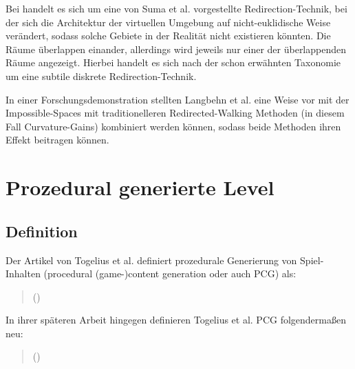 Bei  handelt es sich um eine von
Suma et al. \cite{impossible-spaces-suma} vorgestellte Redirection-Technik, bei der sich die Architektur der virtuellen Umgebung auf nicht-euklidische Weise verändert, sodass solche Gebiete in der Realität nicht existieren könnten.
Die Räume überlappen einander, allerdings wird jeweils nur einer der überlappenden Räume angezeigt. Hierbei handelt es sich nach der schon erwähnten Taxonomie um eine subtile diskrete Redirection-Technik.

In einer Forschungsdemonstration \cite{redirected-spaces} stellten Langbehn et al. eine Weise vor mit der Impossible-Spaces mit traditionelleren Redirected-Walking Methoden (in diesem Fall Curvature-Gains)
kombiniert werden können, sodass beide Methoden ihren Effekt beitragen können.

\section{Prozedural generierte Level}

\subsection{Definition}

Der Artikel \cite{sbpcg} von Togelius et al. definiert prozedurale Generierung von Spiel-Inhalten (procedural (game-)content generation oder auch PCG) als:

\begin{quotation}
\end{quotation}

\begin{quotation}
    ()
\end{quotation}

In ihrer späteren Arbeit hingegen \cite{what-is-pcg} definieren Togelius et al. PCG folgendermaßen neu:
\begin{quotation}
\end{quotation}

\begin{quotation}
    ()
\end{quotation}


